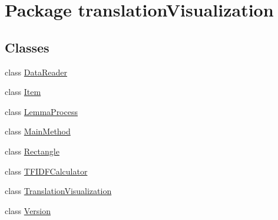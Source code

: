 \hypertarget{namespacetranslation_visualization}{}\section{Package translation\+Visualization}
\label{namespacetranslation_visualization}
\subsection*{Classes}
\begin{DoxyCompactItemize}
\item 
class \hyperlink{classtranslation_visualization_1_1_data_reader}{Data\+Reader}
\item 
class \hyperlink{classtranslation_visualization_1_1_item}{Item}
\item 
class \hyperlink{classtranslation_visualization_1_1_lemma_process}{Lemma\+Process}
\item 
class \hyperlink{classtranslation_visualization_1_1_main_method}{Main\+Method}
\item 
class \hyperlink{classtranslation_visualization_1_1_rectangle}{Rectangle}
\item 
class \hyperlink{classtranslation_visualization_1_1_t_f_i_d_f_calculator}{T\+F\+I\+D\+F\+Calculator}
\item 
class \hyperlink{classtranslation_visualization_1_1_translation_visualization}{Translation\+Visualization}
\item 
class \hyperlink{classtranslation_visualization_1_1_version}{Version}
\end{DoxyCompactItemize}
